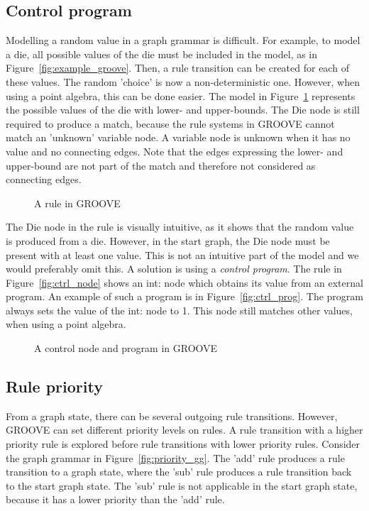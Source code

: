 \subsection{Control program}
Modelling a random value in a graph grammar is difficult. For example, to model a die, all possible values of the die must be included in the model, as in Figure~\ref{fig:example_groove}. Then, a rule transition can be created for each of these values. The random 'choice' is now a non-deterministic one. However, when using a point algebra, this can be done easier. The model in Figure~\ref{fig:placeholder_rule} represents the possible values of the die with lower- and upper-bounds. The Die node is still required to produce a match, because the rule systems in GROOVE cannot match an 'unknown' variable node. A variable node is unknown when it has no value and no connecting edges. Note that the edges expressing the lower- and upper-bound are not part of the match and therefore not considered as connecting edges.

\begin{figure}[ht]
  \begin{center}
    
  \end{center}
  \caption{A rule in GROOVE}
  \label{fig:placeholder_rule}
\end{figure}

The Die node in the rule is visually intuitive, as it shows that the random value is produced from a die. However, in the start graph, the Die node must be present with at least one value. This is not an intuitive part of the model and we would preferably omit this. A solution is using a \textit{control program}. The rule in Figure~\ref{fig:ctrl_node} shows an int: node which obtains its value from an external program. An example of such a program is in Figure~\ref{fig:ctrl_prog}. The program always sets the value of the int: node to 1. This node still matches other values, when using a point algebra.

\begin{figure}[ht]
  \begin{center}
  \end{center}
  \caption{A control node and program in GROOVE}
  \label{fig:ctrl_program}
\end{figure}

\subsection{Rule priority}
From a graph state, there can be several outgoing rule transitions. However, GROOVE can set different priority levels on rules. A rule transition with a higher priority rule is explored before rule transitions with lower priority rules. Consider the graph grammar in Figure~\ref{fig:priority_gg}. The 'add' rule produces a rule transition to a graph state, where the 'sub' rule produces a rule transition back to the start graph state. The 'sub' rule is not applicable in the start graph state, because it has a lower priority than the 'add' rule.

